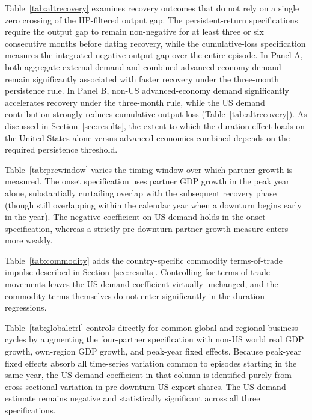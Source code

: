\documentclass[12pt, a4paper]{article}
\begin{document}


Table~\ref{tab:altrecovery} examines recovery outcomes that do not rely on a single zero crossing of the HP-filtered output gap. The persistent-return specifications require the output gap to remain non-negative for at least three or six consecutive months before dating recovery, while the cumulative-loss specification measures the integrated negative output gap over the entire episode. In Panel A, both aggregate external demand and combined advanced-economy demand remain significantly associated with faster recovery under the three-month persistence rule. In Panel B, non-US advanced-economy demand significantly accelerates recovery under the three-month rule, while the US demand contribution strongly reduces cumulative output loss (Table~\ref{tab:altrecovery}). As discussed in Section~\ref{sec:results}, the extent to which the duration effect loads on the United States alone versus advanced economies combined depends on the required persistence threshold.



Table~\ref{tab:prewindow} varies the timing window over which partner growth is measured. The onset specification uses partner GDP growth in the peak year alone, substantially curtailing overlap with the subsequent recovery phase (though still overlapping within the calendar year when a downturn begins early in the year). The negative coefficient on US demand holds in the onset specification, whereas a strictly pre-downturn partner-growth measure enters more weakly.



Table~\ref{tab:commodity} adds the country-specific commodity terms-of-trade impulse described in Section~\ref{sec:results}. Controlling for terms-of-trade movements leaves the US demand coefficient virtually unchanged, and the commodity terms themselves do not enter significantly in the duration regressions.



Table~\ref{tab:globalctrl} controls directly for common global and regional business cycles by augmenting the four-partner specification with non-US world real GDP growth, own-region GDP growth, and peak-year fixed effects. Because peak-year fixed effects absorb all time-series variation common to episodes starting in the same year, the US demand coefficient in that column is identified purely from cross-sectional variation in pre-downturn US export shares. The US demand estimate remains negative and statistically significant across all three specifications.
\end{document}
